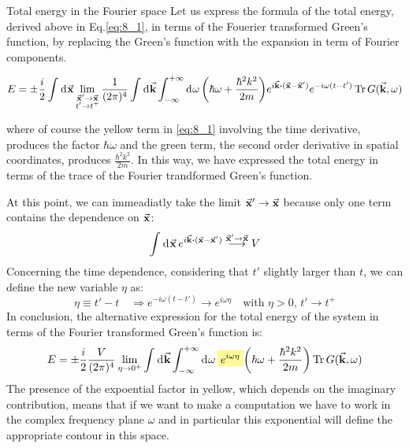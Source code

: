 \documentclass[../main/main.tex]{subfiles}
\begin{document}
\begin{example}{Total energy in the Fourier space}{}
Let us express the formula of the total energy, derived above in Eq.\eqref{eq:8_1}, in terms of the Fouerier transformed Green's function, by replacing the Green's function with the expansion in term of Fourier components.
\begin{small}
\begin{equation*}
  E = \pm \frac{i}{2}
  \int_{}^{} \dd[]{\va{x}} \lim_{\substack{\va{x}'\rightarrow \va{x} \\ t' \rightarrow t^+} }
  \frac{1}{(2 \pi )^4} \int_{}^{} \dd[]{\va{k}}
  \int_{-\infty }^{+\infty } \dd[]{\omega }
  \qty(\hbar \omega + \frac{\hbar ^2 k^2}{2m})
  e^{i \va{k}\vdot (\va{x}-\va{x}')} e^{- i \omega (t-t')}
  \Tr G (\va{k}, \omega )
\end{equation*}
\end{small}
where of course the yellow term in \eqref{eq:8_1} involving the time derivative, produces the factor \( \hbar \omega  \) and the green term, the second order derivative in spatial coordinates, produces \( \frac{\hbar ^2 k^2}{2m} \). In this way, we have expressed the total energy in terms of the trace of the Fourier trandformed Green's function.

At this point, we can immeadiatly take the limit \( \va{x}' \rightarrow \va{x} \) because only one term contains the dependence on \( \va{x}\):
\begin{equation*}
  \int_{}^{} \dd[]{\va{x}} e^{i \va{k}\vdot (\va{x}-\va{x}')} \overset{\va{x}'\rightarrow \va{x}}{\longrightarrow } V
\end{equation*}
Concerning the time dependence, considering that \( t'  \) slightly larger than \( t \), we can define the new variable \( \eta  \) as:
\begin{equation*}
  \eta \equiv t'-t \quad \Rightarrow e^{- i \omega (t-t')} \rightarrow e^{i \omega \eta } \quad \text{with } \eta >0,\, t'\rightarrow t^+
\end{equation*}
In conclusion, the alternative expression for the total energy of the system in terms of the Fourier transformed Green's function is:
\begin{equation}
  E = \pm \frac{i}{2} \frac{V}{(2 \pi )^4}
  \lim_{\eta \rightarrow 0^+}
  \int_{}^{} \dd[]{\va{k}}
  \int_{-\infty }^{+\infty } \dd[]{\omega }
  \mathcolorbox{yellow!40}{e^{i \omega \eta }}
  \qty(\hbar \omega + \frac{\hbar ^2 k^2}{2m})
  \Tr G (\va{k}, \omega )
\end{equation}
The presence of the expoential factor in yellow, which depends on the imaginary contribution, means that if we want to make a computation we have to work in the complex frequency plane \( \omega  \) and in particular this exponential will define the appropriate contour in this space.
\end{example}
\end{document}
